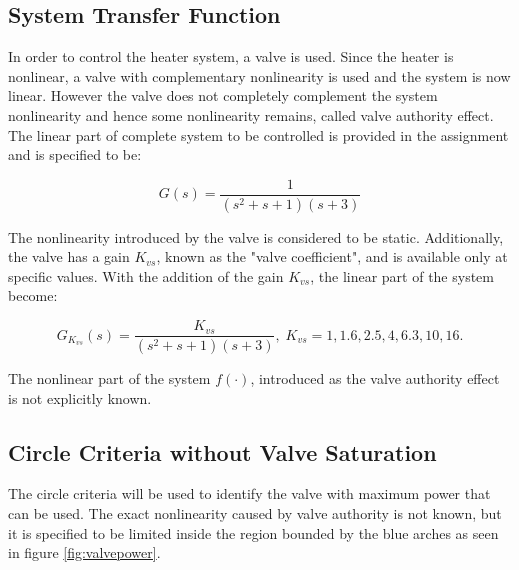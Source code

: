 \documentclass[a4paper, titlepage]{article}
\begin{document}
\subsection{System Transfer Function}
In order to control the heater system, a valve is used.
Since the heater is nonlinear, a valve with complementary nonlinearity is used and the system is now linear.
However the valve does not completely complement the system nonlinearity and hence some nonlinearity remains, called valve authority effect.
The linear part of complete system to be controlled is provided in the assignment and is specified to be:

\begin{equation}
	G(s) = \frac{1}{(s^2+s+1)(s+3)}
	\label{equ:system}
\end{equation}

The nonlinearity introduced by the valve is considered to be static.  Additionally, the valve has a gain $K_{vs}$, known as the "valve coefficient", and is available only at specific values.
With the addition of the gain $K_{vs}$, the linear part of the system become:

\begin{equation}
	G_{K_{vs}}(s) = \frac{K_{vs}}{(s^2+s+1)(s+3)}, \; K_{vs}=1, 1.6, 2.5, 4, 6.3, 10, 16.
	\label{equ:systemTF}
\end{equation}

The nonlinear part of the system $f(\cdot)$, introduced as the valve authority effect is not explicitly known.

\subsection{Circle Criteria without Valve Saturation}

The circle criteria will be used to identify the valve with maximum power that can be used.  The exact nonlinearity caused by valve authority is not known, but it is specified to be limited inside the region bounded by the blue arches as seen in figure \ref{fig:valvepower}.
\end{document}
